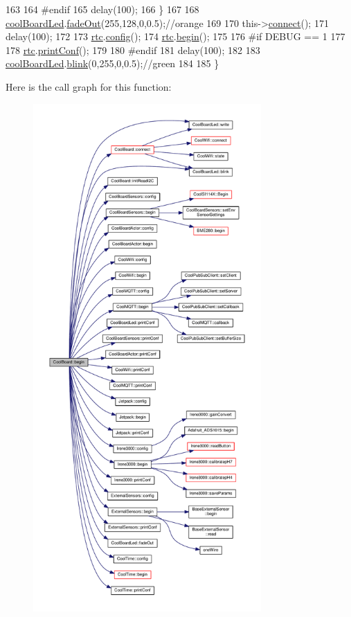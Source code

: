 \begin{DoxyCode}
163 
164 \textcolor{preprocessor}{    #endif}
165         delay(100);
166     \}
167     
168     \hyperlink{class_cool_board_a1b1d3c684a5baa56b08486e192fd8e97}{coolBoardLed}.\hyperlink{class_cool_board_led_a93d545679237e8cc858324367149775c}{fadeOut}(255,128,0,0.5);\textcolor{comment}{//orange}
169 
170     this->\hyperlink{class_cool_board_a519de78b807f8ec6463ff484eb925918}{connect}();
171     delay(100);
172 
173     \hyperlink{class_cool_board_a50d2a6716879d64a85f3c6b44ad63275}{rtc}.\hyperlink{class_cool_time_a87c28260c1bc77091162cbcf1ee2e129}{config}();
174     \hyperlink{class_cool_board_a50d2a6716879d64a85f3c6b44ad63275}{rtc}.\hyperlink{class_cool_time_ab1976cf718b950bc31e003c3323b8adb}{begin}();
175 
176 \textcolor{preprocessor}{#if DEBUG == 1}
177 
178     \hyperlink{class_cool_board_a50d2a6716879d64a85f3c6b44ad63275}{rtc}.\hyperlink{class_cool_time_af355e7f9b3898211cd2ff25eab5933b1}{printConf}();
179 
180 \textcolor{preprocessor}{#endif}
181     delay(100);
182     
183     \hyperlink{class_cool_board_a1b1d3c684a5baa56b08486e192fd8e97}{coolBoardLed}.\hyperlink{class_cool_board_led_a96e1ea13003eee34c9dbcef340404426}{blink}(0,255,0,0.5);\textcolor{comment}{//green}
184 
185 \}
\end{DoxyCode}
Here is the call graph for this function\+:\nopagebreak
\begin{figure}[H]
\begin{center}
\leavevmode
\includegraphics[height=550pt]{d7/df9/class_cool_board_acba7c5aef7268b2c0044bdb54d3b9d76_cgraph}
\end{center}
\end{figure}
